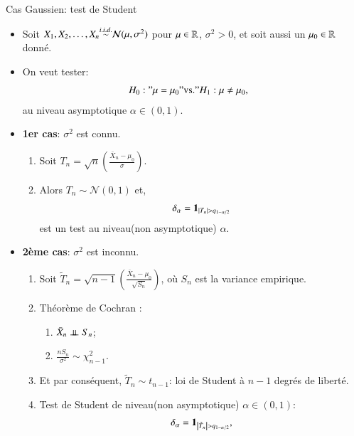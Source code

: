 \begin{frame}
    [allowframebreaks]{Cas Gaussien: test de Student}
    \begin{itemize}
        \item Soit $X_1, X_2, \ldots, X_n{\overset{i.i.d.}{\sim}}\mathcal{N}(\mu, \sigma^2)$ pour $\mu\in\mathbb{R}$, $\sigma^2>0$, 
         et soit aussi un $\mu_0\in \mathbb{R}$  donné.
         \item On veut tester: \begin{align*}
             H_0: "\mu = \mu_0" &\text{vs.} "H_1 : \mu\neq \mu_0,
         \end{align*}
         au niveau asymptotique $\alpha\in(0,1)$.
         \item \textbf{1er cas}: $\sigma^2$ est connu.
         \begin{enumerate}[-]
             \item Soit $T_n  = \sqrt{n}\left(\frac{\bar{X}_n - \mu_0}{\sigma}\right)$. 
             \item Alors $T_n\sim \mathcal{N}(0,1)$ et, 
             \begin{align*}
                 \delta_\alpha = \mathbf{1}_{\left\vert {T_n} \right\vert > q_{1-\alpha / 2}}
             \end{align*}
             est un test au niveau(non asymptotique) $\alpha$.
         \end{enumerate}
         \framebreak
         \item \textbf{2ème cas}: $\sigma^2$ est inconnu.
         \begin{enumerate}[-]
            \item Soit $\tilde{T}_n  = \sqrt{n - 1}\left(\frac{\bar{X}_n - \mu_0}{\sqrt{S_n}}\right)$, 
            où $S_n$ est la variance empirique.
            \item Théorème de Cochran : \begin{enumerate}[-]
                \item $\bar{X}_n \perp\!\!\!\perp S_n$;
                \item $\frac{nS_n}{\sigma^2}\sim\chi^2_{n-1}$.
            \end{enumerate}
            \item Et par conséquent, $\tilde{T}_n \sim t_{n-1}$: loi de Student à $n-1$ degrés de liberté.
            \framebreak
            \item Test de Student de niveau(non asymptotique) $\alpha\in(0,1)$: 
            \begin{align*}
                \delta_\alpha = \Ind_{\abs{\tilde{T}_n} > q_{1-\alpha / 2}},

\end{align*}
\end{enumerate}
\end{itemize}
\end{frame}
